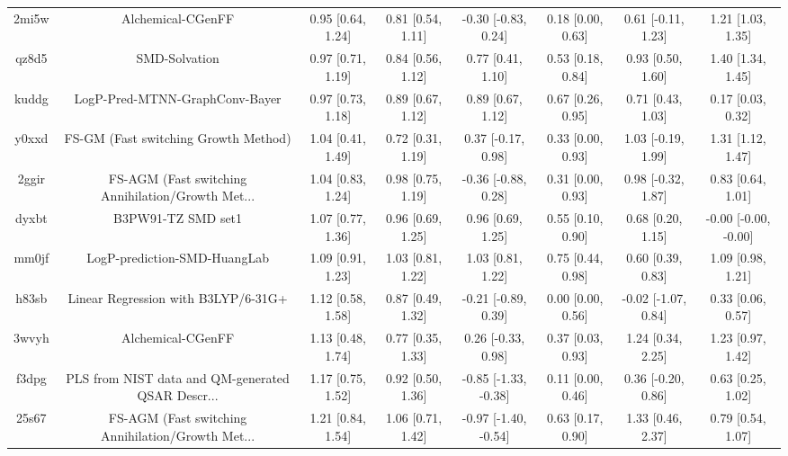 \documentclass{article}
\begin{document}
\begin{center}
\begin{longtable}{|cccccccc|}
 2mi5w &                                  Alchemical-CGenFF &  0.95 [0.64, 1.24] &  0.81 [0.54, 1.11] &   -0.30 [-0.83, 0.24] &  0.18 [0.00, 0.63] &   0.61 [-0.11, 1.23] &     1.21 [1.03, 1.35] \\
 qz8d5 &                                      SMD-Solvation &  0.97 [0.71, 1.19] &  0.84 [0.56, 1.12] &     0.77 [0.41, 1.10] &  0.53 [0.18, 0.84] &    0.93 [0.50, 1.60] &     1.40 [1.34, 1.45] \\
 kuddg &                     LogP-Pred-MTNN-GraphConv-Bayer &  0.97 [0.73, 1.18] &  0.89 [0.67, 1.12] &     0.89 [0.67, 1.12] &  0.67 [0.26, 0.95] &    0.71 [0.43, 1.03] &     0.17 [0.03, 0.32] \\
 y0xxd &               FS-GM (Fast switching Growth Method) &  1.04 [0.41, 1.49] &  0.72 [0.31, 1.19] &    0.37 [-0.17, 0.98] &  0.33 [0.00, 0.93] &   1.03 [-0.19, 1.99] &     1.31 [1.12, 1.47] \\
 2ggir &  FS-AGM (Fast switching Annihilation/Growth Met... &  1.04 [0.83, 1.24] &  0.98 [0.75, 1.19] &   -0.36 [-0.88, 0.28] &  0.31 [0.00, 0.93] &   0.98 [-0.32, 1.87] &     0.83 [0.64, 1.01] \\
 dyxbt &                                 B3PW91-TZ SMD set1 &  1.07 [0.77, 1.36] &  0.96 [0.69, 1.25] &     0.96 [0.69, 1.25] &  0.55 [0.10, 0.90] &    0.68 [0.20, 1.15] &  -0.00 [-0.00, -0.00] \\
 mm0jf &                       LogP-prediction-SMD-HuangLab &  1.09 [0.91, 1.23] &  1.03 [0.81, 1.22] &     1.03 [0.81, 1.22] &  0.75 [0.44, 0.98] &    0.60 [0.39, 0.83] &     1.09 [0.98, 1.21] \\
 h83sb &                Linear Regression with B3LYP/6-31G+ &  1.12 [0.58, 1.58] &  0.87 [0.49, 1.32] &   -0.21 [-0.89, 0.39] &  0.00 [0.00, 0.56] &  -0.02 [-1.07, 0.84] &     0.33 [0.06, 0.57] \\
 3wvyh &                                  Alchemical-CGenFF &  1.13 [0.48, 1.74] &  0.77 [0.35, 1.33] &    0.26 [-0.33, 0.98] &  0.37 [0.03, 0.93] &    1.24 [0.34, 2.25] &     1.23 [0.97, 1.42] \\
 f3dpg &  PLS from NIST data and QM-generated QSAR Descr... &  1.17 [0.75, 1.52] &  0.92 [0.50, 1.36] &  -0.85 [-1.33, -0.38] &  0.11 [0.00, 0.46] &   0.36 [-0.20, 0.86] &     0.63 [0.25, 1.02] \\
 25s67 &  FS-AGM (Fast switching Annihilation/Growth Met... &  1.21 [0.84, 1.54] &  1.06 [0.71, 1.42] &  -0.97 [-1.40, -0.54] &  0.63 [0.17, 0.90] &    1.33 [0.46, 2.37] &     0.79 [0.54, 1.07] \\

\end{longtable}
\end{center}
\end{document}
